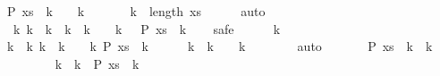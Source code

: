 \begin{isabellebody}
\ {\isachardoublequoteopen}P\ {\isacharparenleft}xs\ {\isacharbang}\ {\isacharparenleft}k{}\ {\isacharplus}\ {}\ {\isacharplus}\ k{}{\isacharprime}{\isacharparenright}{\isacharparenright}{\isachardoublequoteclose}\isanewline
\ \ \ \ \isamarkupfalse%
\ {\isacharasterisk}\ {\isacartoucheopen}k{}\ {\isacharless}\ length\ xs{\isacartoucheclose}\isanewline
\ \ \ \ \isamarkupfalse%
\ auto\isanewline
\ \ \isamarkupfalse%
\isanewline
\ \ \isamarkupfalse%
\ {\isachardoublequoteopen}{\isasymforall}\ k{\isacharprime}{\isachardot}\ k{}\ {\isacharless}\ k{\isacharprime}\ {\isasymand}\ k{\isacharprime}\ {\isacharless}\ k{}\ {\isacharplus}\ {}\ {\isacharplus}\ k{}{\isacharprime}\ {\isasymlongrightarrow}\ {\isasymnot}\ P\ {\isacharparenleft}xs\ {\isacharbang}\ k{\isacharprime}{\isacharparenright}{\isachardoublequoteclose}\isanewline
\ \ \isamarkupfalse%
\ safe\isanewline
\ \ \ \ \isamarkupfalse%
\ k{\isacharprime}\isanewline
\ \ \ \ \isamarkupfalse%
\ {\isachardoublequoteopen}k{}\ {\isacharless}\ k{\isacharprime}{\isachardoublequoteclose}\ {\isachardoublequoteopen}k{\isacharprime}\ {\isacharless}\ k{}\ {\isacharplus}\ {}\ {\isacharplus}\ k{}{\isacharprime}{\isachardoublequoteclose}\ {\isachardoublequoteopen}P\ {\isacharparenleft}xs\ {\isacharbang}\ k{\isacharprime}{\isacharparenright}{\isachardoublequoteclose}\isanewline
\ \ \ \ \isamarkupfalse%
\ {\isachardoublequoteopen}k{\isacharprime}\ {\isacharminus}\ {\isacharparenleft}k{}\ {\isacharplus}\ {}{\isacharparenright}\ {\isacharless}\ k{}{\isacharprime}{\isachardoublequoteclose}\isanewline
\ \ \ \ \ \ \isamarkupfalse%
\ auto\isanewline
\ \ \ \ \isamarkupfalse%
\ {\isachardoublequoteopen}{\isasymnot}\ P\ {\isacharparenleft}{\isacharquery}xs\ {\isacharbang}\ {\isacharparenleft}k{\isacharprime}\ {\isacharminus}\ {\isacharparenleft}k{}\ {\isacharplus}\ {}{\isacharparenright}{\isacharparenright}{\isacharparenright}{\isachardoublequoteclose}\isanewline
\ \ \ \ \ \ \isamarkupfalse%
\ {\isacharbackquoteopen}{\isasymforall}\ k{\isacharprime}\ {\isacharless}\ k{}{\isacharprime}{\isachardot}\ {\isasymnot}\ P\ {\isacharparenleft}{\isacharquery}xs\ {\isacharbang}\ k{\isacharprime}{\isacharparenright}{\isacharbackquoteclose}\isanewline

\end{isabellebody}
